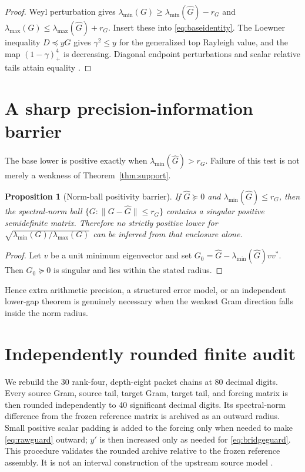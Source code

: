 \documentclass[12pt]{article}
\newtheorem{proposition}[theorem]{Proposition}
\begin{document}
\begin{proof}
Weyl perturbation gives
$\lambda_{\min}(G)\geq\lambda_{\min}(\widehat G)-r_G$ and
$\lambda_{\max}(G)\leq\lambda_{\max}(\widehat G)+r_G$.  Insert these into
\eqref{eq:baseidentity}.  The Loewner inequality $D\preceq yG$ gives
$\gamma^2\leq y$ for the generalized top Rayleigh value, and the map
$(1-\gamma)_+^4$ is decreasing.  Diagonal endpoint perturbations and scalar
relative tails attain equality \citep{Bhatia1997}.
\end{proof}

\section{A sharp precision-information barrier}
The base lower is positive exactly when
$\lambda_{\min}(\widehat G)>r_G$.  Failure of this test is not merely a
weakness of Theorem~\ref{thm:support}.

\begin{proposition}[Norm-ball positivity barrier]\label{prop:precision}
If $\widehat G\succeq0$ and
$\lambda_{\min}(\widehat G)\leq r_G$, then the spectral-norm ball
$\{G:\|G-\widehat G\|\leq r_G\}$ contains a singular positive semidefinite
matrix.  Therefore no strictly positive lower for
$\sqrt{\lambda_{\min}(G)/\lambda_{\max}(G)}$ can be inferred from that
enclosure alone.
\end{proposition}

\begin{proof}
Let $v$ be a unit minimum eigenvector and set
$G_0=\widehat G-\lambda_{\min}(\widehat G)vv^*$.  Then $G_0\succeq0$ is
singular and lies within the stated radius.
\end{proof}

Hence extra arithmetic precision, a structured error model, or an
independent lower-gap theorem is genuinely necessary when the weakest Gram
direction falls inside the norm radius.

\section{Independently rounded finite audit}
We rebuild the 30 rank-four, depth-eight packet chains at 80 decimal digits.
Every source Gram, source tail, target Gram, target tail, and forcing matrix
is then rounded independently to 40 significant decimal digits.  Its
spectral-norm difference from the frozen reference matrix is archived as an
outward radius.  Small positive scalar padding is added to the forcing only
when needed to make \eqref{eq:rawguard} outward; $y'$ is then increased only
as needed for \eqref{eq:bridgeguard}.  This procedure validates the rounded
archive relative to the frozen reference assembly.  It is not an interval
construction of the upstream source model \citep{Higham2002}.
\end{document}
